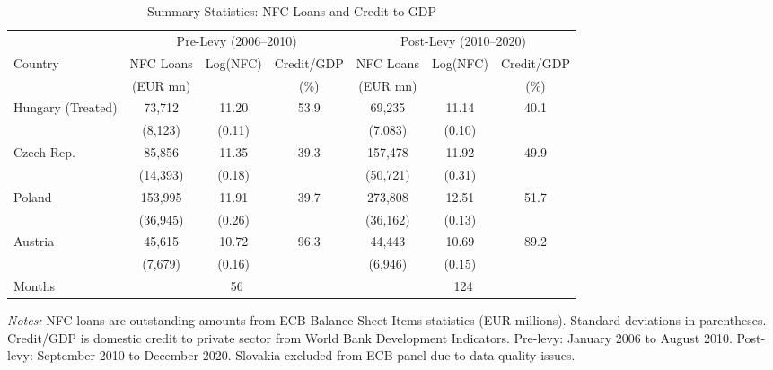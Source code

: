 \begin{table}[H]
\centering
\caption{Summary Statistics: NFC Loans and Credit-to-GDP}
\label{tab:summary}
\small
\begin{adjustbox}{max width=\textwidth}
\begin{tabular}{lcccccc}
\toprule
 & \multicolumn{3}{c}{Pre-Levy (2006--2010)} & \multicolumn{3}{c}{Post-Levy (2010--2020)} \\
\cmidrule(lr){2-4} \cmidrule(lr){5-7}
Country & NFC Loans & Log(NFC) & Credit/GDP & NFC Loans & Log(NFC) & Credit/GDP \\
 & (EUR mn) & & (\%) & (EUR mn) & & (\%) \\
\midrule
Hungary (Treated) & 73,712 & 11.20 & 53.9 & 69,235 & 11.14 & 40.1 \\
 & (8,123) & (0.11) & & (7,083) & (0.10) & \\
Czech Rep. & 85,856 & 11.35 & 39.3 & 157,478 & 11.92 & 49.9 \\
 & (14,393) & (0.18) & & (50,721) & (0.31) & \\
Poland & 153,995 & 11.91 & 39.7 & 273,808 & 12.51 & 51.7 \\
 & (36,945) & (0.26) & & (36,162) & (0.13) & \\
Austria & 45,615 & 10.72 & 96.3 & 44,443 & 10.69 & 89.2 \\
 & (7,679) & (0.16) & & (6,946) & (0.15) & \\
\midrule
Months & \multicolumn{3}{c}{56} & \multicolumn{3}{c}{124} \\
\bottomrule
\end{tabular}
\end{adjustbox}
\par\vspace{0.3em}
{\footnotesize \textit{Notes:} NFC loans are outstanding amounts from ECB Balance Sheet Items statistics (EUR millions). Standard deviations in parentheses. Credit/GDP is domestic credit to private sector from World Bank Development Indicators. Pre-levy: January 2006 to August 2010. Post-levy: September 2010 to December 2020. Slovakia excluded from ECB panel due to data quality issues.}
\end{table}
